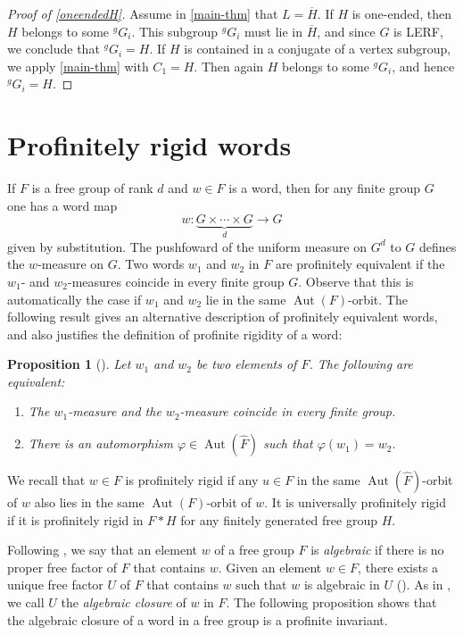 \documentclass[a4paper]{amsart}
\newtheorem{pro}[lem]{Proposition}
\theoremstyle{definition}
\theoremstyle{remark}
\DeclareMathOperator{\Aut}{\mathrm{Aut}}
\begin{document}
\begin{proof}[Proof of \cref{oneendedH}] Assume in \cref{main-thm} that \(L = \overline{H}\). If \(H\) is one-ended, then \(H\) belongs to some \({^g G_i}\). This subgroup \({^g G_i}\) must lie in \(\overline{H} \), and since \(G\) is LERF, we conclude that \({^g G_i} = H\). If \(H\) is contained in a conjugate of a vertex subgroup, we apply \cref{main-thm} with \(C_1 = H\). Then again \(H\) belongs to some \({^g G_i}\), and hence \({^g G_i} = H\).
\end{proof}
 
\section{Profinitely rigid words}\label{sect:rigid-words}

If \(F\) is a free group of rank \(d\) and \(w \in F\) is a word, then for any finite group \(G\) one has a word map \[w\colon \underbrace{G \times \cdots \times G}_{d} \to G\] given by substitution. The pushfoward of the uniform measure on \(G^d\) to \(G\) defines the \(w\)-measure on \(G\). Two words \(w_1\) and \(w_2\) in \(F\) are profinitely equivalent if the \(w_1\)- and \(w_2\)-measures coincide in every finite group \(G\). Observe that this is automatically the case if \(w_1\) and \(w_2\) lie in the same \(\Aut(F)\)-orbit. The following result gives an alternative description of profinitely equivalent words, and also justifies the definition of profinite rigidity of a word:

\begin{pro}[{\cite[Thm. 2.2]{hanany_orbits_2020}}] Let \(w_1\) and \(w_2\) be two elements of \(F\). The following are equivalent:
\begin{enumerate}
    \item The \(w_1\)-measure and the \(w_2\)-measure coincide in every finite group.
    \item There is an automorphism \(\varphi\in \Aut(\widehat{F})\) such that \(\varphi(w_1) = w_2\).
\end{enumerate}
\end{pro}

We recall that \(w \in F\) is profinitely rigid if any \(u \in F\) in the same \(\Aut(\widehat{F})\)-orbit of \(w\) also lies in the same \(\Aut(F)\)-orbit of \(w\). It is universally profinitely rigid if it is profinitely rigid in \(F*H\) for any finitely generated free group \(H\).

Following \cite[Sec. 3]{Miasnikov2007}, we say that an element \(w\) of a free group \(F\) is \emph{algebraic} if there is no proper free factor of \(F\) that contains \(w\). Given an element \(w \in F\), there exists a unique free factor \(U\) of \(F\) that contains \(w\) such that \(w\) is algebraic in \(U\) (\cite[Sec. 3.4]{Miasnikov2007}). As in \cite{Miasnikov2007}, we call \(U\) the \emph{algebraic closure} of \(w\) in \(F\). The following proposition shows that the algebraic closure of a word in a free group is a profinite invariant.
\end{document}
